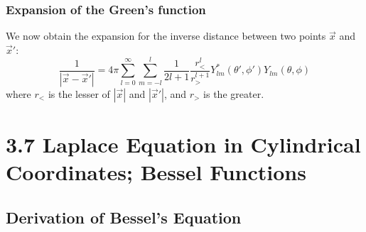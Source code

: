 \documentclass{article}
\begin{document}
	\subsubsection{Expansion of the Green's function}
	We now obtain the expansion for the inverse distance between two points $\vec{x}$ and $\vec{x}'$:
	\[
	\frac{1}{|\vec{x} - \vec{x}'|} = 4\pi \sum_{l=0}^{\infty} \sum_{m=-l}^{l} \frac{1}{2l+1} \frac{r_{<}^l}{r_{>}^{l+1}} Y_{lm}^*(\theta', \phi') Y_{lm}(\theta, \phi)
	\]
	where $r_<$ is the lesser of $|\vec{x}|$ and $|\vec{x}'|$, and $r_>$ is the greater.
	\section*{3.7 Laplace Equation in Cylindrical Coordinates; Bessel Functions}
	
	\subsection*{Derivation of Bessel's Equation}
\end{document}
